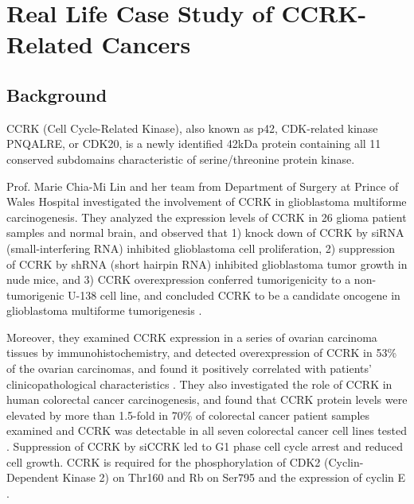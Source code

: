 \chapter{Real Life Case Study of CCRK-Related Cancers}


\section{Background}

CCRK (Cell Cycle-Related Kinase), also known as p42, CDK-related kinase PNQALRE, or CDK20, is a newly identified 42kDa protein containing all 11 conserved subdomains characteristic of serine/threonine protein kinase.

Prof. Marie Chia-Mi Lin and her team from Department of Surgery at Prince of Wales Hospital investigated the involvement of CCRK in glioblastoma multiforme carcinogenesis. They analyzed the expression levels of CCRK in 26 glioma patient samples and normal brain, and observed that 1) knock down of CCRK by siRNA (small-interfering RNA) inhibited glioblastoma cell proliferation, 2) suppression of CCRK by shRNA (short hairpin RNA) inhibited glioblastoma tumor growth in nude mice, and 3) CCRK overexpression conferred tumorigenicity to a non-tumorigenic U-138 cell line, and concluded CCRK to be a candidate oncogene in glioblastoma multiforme tumorigenesis \citep{1144}.

Moreover, they examined CCRK expression in a series of ovarian carcinoma tissues by immunohistochemistry, and detected overexpression of CCRK in 53\% of the ovarian carcinomas, and found it positively correlated with patients' clinicopathological characteristics \citep{1145}. They also investigated the role of CCRK in human colorectal cancer carcinogenesis, and found that CCRK protein levels were elevated by more than 1.5-fold in 70\% of colorectal cancer patient samples examined and CCRK was detectable in all seven colorectal cancer cell lines tested \citep{1143}. Suppression of CCRK by siCCRK led to G1 phase cell cycle arrest and reduced cell growth. CCRK is required for the phosphorylation of CDK2 (Cyclin-Dependent Kinase 2) on Thr160 and Rb on Ser795 and the expression of cyclin E \citep{1143}. 

